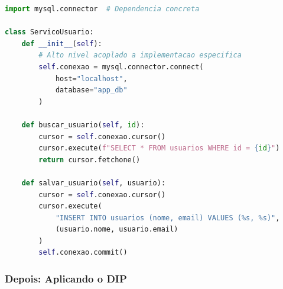 \begin{lstlisting}[language=Python, caption={Violação do DIP: alto nível depende de baixo nível}]
import mysql.connector  # Dependencia concreta

class ServicoUsuario:
    def __init__(self):
        # Alto nivel acoplado a implementacao especifica
        self.conexao = mysql.connector.connect(
            host="localhost",
            database="app_db"
        )

    def buscar_usuario(self, id):
        cursor = self.conexao.cursor()
        cursor.execute(f"SELECT * FROM usuarios WHERE id = {id}")
        return cursor.fetchone()

    def salvar_usuario(self, usuario):
        cursor = self.conexao.cursor()
        cursor.execute(
            "INSERT INTO usuarios (nome, email) VALUES (%s, %s)",
            (usuario.nome, usuario.email)
        )
        self.conexao.commit()
\end{lstlisting}

\subsubsection{Depois: Aplicando o DIP}

